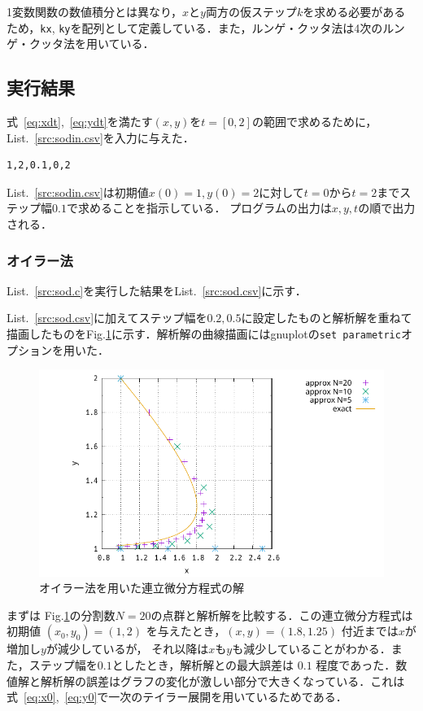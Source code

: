 \documentclass[gutter=20mm,fore-edge=20mm,head_space=30mm,foot_space=30mm]{jlreq}
\begin{document}
1変数関数の数値積分とは異なり，$x$と$y$両方の仮ステップ$k$を求める必要があるため，\verb|kx|, \verb|ky|を配列として定義している．また，ルンゲ・クッタ法は4次のルンゲ・クッタ法を用いている．

\subsection{実行結果}
式~\ref{eq:xdt},~\ref{eq:ydt}を満たす$(x,y)$を$t=[0,2]$の範囲で求めるために，List.~\ref{src:sodin.csv}を入力に与えた．
\begin{lstlisting}[caption=sodin.csv,label=src:sodin.csv]
1,2,0.1,0,2
\end{lstlisting}
List.~\ref{src:sodin.csv}は初期値$x(0) = 1, y(0) = 2$に対して$t=0$から$t=2$までステップ幅$0.1$で求めることを指示している．
プログラムの出力は$x,y,t$の順で出力される．
\subsubsection{オイラー法}
List.~\ref{src:sod.c}を実行した結果をList.~\ref{src:sod.csv}に示す．

List.~\ref{src:sod.csv}に加えてステップ幅を$0.2, 0.5$に設定したものと解析解を重ねて描画したものをFig.\ref{fig:sod}に示す．解析解の曲線描画にはgnuplotの\verb|set parametric|オプションを用いた．
\begin{figure}[H]
  \centering
  \includegraphics[width=0.8\linewidth]{1-1.pdf} %
  \caption{オイラー法を用いた連立微分方程式の解}
  \label{fig:sod}
\end{figure}

まずは Fig.\ref{fig:sod}の分割数$N=20$の点群と解析解を比較する．この連立微分方程式は初期値 $(x_0, y_0) = (1, 2)$ を与えたとき，$(x, y) = (1.8, 1.25)$ 付近までは$x$が増加し$y$が減少しているが，
それ以降は$x$も$y$も減少していることがわかる．また，ステップ幅を$0.1$としたとき，解析解との最大誤差は $0.1$ 程度であった．数値解と解析解の誤差はグラフの変化が激しい部分で大きくなっている．これは式~\ref{eq:x0},~\ref{eq:y0}で一次のテイラー展開を用いているためである．
\end{document}
